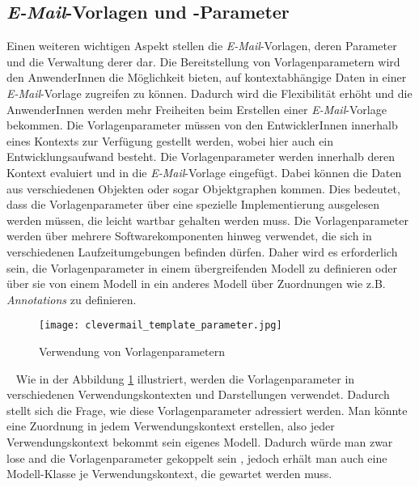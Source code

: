 \subsection{\emph{E-Mail}-Vorlagen und -Parameter}
Einen weiteren wichtigen Aspekt stellen die \emph{E-Mail}-Vorlagen, deren Parameter und die Verwaltung derer dar. Die Bereitstellung von Vorlagenparametern wird den AnwenderInnen die Möglichkeit bieten, auf kontextabhängige Daten in einer \emph{E-Mail}-Vorlage zugreifen zu können. Dadurch wird die Flexibilität erhöht und die AnwenderInnen werden mehr Freiheiten beim Erstellen einer \emph{E-Mail}-Vorlage bekommen. 
\newline
\newline
Die Vorlagenparameter müssen von den EntwicklerInnen innerhalb eines Kontexts zur Verfügung gestellt werden, wobei hier auch ein Entwicklungsaufwand besteht. Die Vorlagenparameter werden innerhalb deren Kontext evaluiert und in die \emph{E-Mail}-Vorlage eingefügt. Dabei können die Daten aus verschiedenen Objekten oder sogar Objektgraphen kommen. Dies bedeutet, dass die Vorlagenparameter über eine spezielle Implementierung ausgelesen werden müssen, die leicht wartbar gehalten werden muss. 
\newline
\newline
Die Vorlagenparameter werden über mehrere Softwarekomponenten hinweg verwendet, die sich in verschiedenen Laufzeitumgebungen befinden dürfen. Daher wird es erforderlich sein, die Vorlagenparameter in einem übergreifenden Modell zu definieren oder über sie von einem Modell in ein anderes Modell über Zuordnungen wie z.B. \emph{Annotations} zu definieren.
\begin{figure}[h]
\centering
\texttt{[image: clevermail\_template\_parameter.jpg]}
\caption{Verwendung von Vorlagenparametern}
\label{fig:clevermail-template-parameter}
\end{figure}
\ \newline
Wie in der Abbildung \ref{fig:clevermail-template-parameter} illustriert, werden die Vorlagenparameter in verschiedenen Verwendungskontexten und Darstellungen verwendet. Dadurch stellt sich die Frage, wie diese Vorlagenparameter adressiert werden. Man könnte eine Zuordnung in jedem Verwendungskontext erstellen, also jeder Verwendungskontext bekommt sein eigenes Modell. Dadurch würde man zwar lose and die Vorlagenparameter gekoppelt sein , jedoch erhält man auch eine Modell-Klasse je Verwendungskontext, die gewartet werden muss. 

